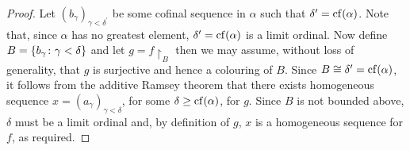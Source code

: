     \begin{proof}
        Let $(b_\gamma)_{\gamma<\delta^\prime}$ be some cofinal sequence in $\alpha$ such that $\delta^\prime=\operatorname{cf}(\alpha)$.  Note that, since $\alpha$ has no greatest element, $\delta^\prime=\operatorname{cf}(\alpha)$ is a limit ordinal.  Now define $B=\{ b_\gamma\colon \gamma<\delta \}$ and let $g=f\restriction_B$ then we may assume, without loss of generality, that $g$ is surjective and hence a colouring of $B$.  Since $B\cong\delta^\prime=\operatorname{cf}(\alpha)$, it follows from the additive Ramsey theorem that there exists homogeneous sequence $x=(a_\gamma)_{\gamma<\delta}$, for some $\delta\geq\operatorname{cf}(\alpha)$, for $g$.  Since $B$ is not bounded above, $\delta$ must be a limit ordinal and, by definition of $g$, $x$ is a homogeneous sequence for $f$, as required.
    \end{proof}




